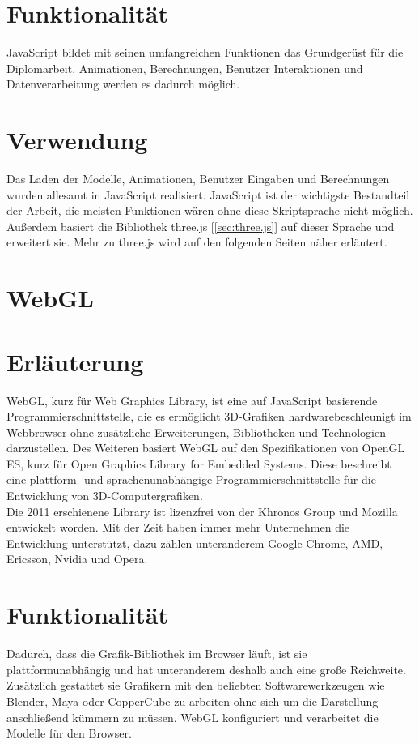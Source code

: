 \section*{Funktionalität}
JavaScript bildet mit seinen umfangreichen Funktionen das Grundgerüst für die Diplomarbeit. Animationen, Berechnungen, Benutzer Interaktionen und Datenverarbeitung werden es dadurch möglich.


\section*{Verwendung}
Das Laden der Modelle, Animationen, Benutzer Eingaben und Berechnungen wurden allesamt in JavaScript realisiert. JavaScript ist der wichtigste Bestandteil der Arbeit, die meisten Funktionen wären ohne diese Skriptsprache nicht möglich.  Außerdem basiert die Bibliothek three.js [\ref{sec:three.js}] auf dieser Sprache und erweitert sie. Mehr zu three.js wird auf den folgenden Seiten näher erläutert.

\newpage
\clearpage


\section{WebGL}\label{sec:WebGL}
\cite{khronos_webgl}\cite{mdn_webgl}
\section*{Erläuterung}
WebGL, kurz für Web Graphics Library, ist eine auf JavaScript basierende Programmierschnittstelle, die es ermöglicht 3D-Grafiken hardwarebeschleunigt im Webbrowser ohne zusätzliche Erweiterungen, Bibliotheken und Technologien darzustellen. Des Weiteren basiert WebGL auf den Spezifikationen von OpenGL ES, kurz für Open Graphics Library for Embedded Systems. Diese beschreibt eine plattform- und sprachenunabhängige Programmierschnittstelle für die Entwicklung von 3D-Computergrafiken. 
\\
Die 2011 erschienene Library ist lizenzfrei von der Khronos Group und Mozilla entwickelt worden. Mit der Zeit haben immer mehr Unternehmen die Entwicklung unterstützt, dazu zählen unteranderem Google Chrome, AMD, Ericsson, Nvidia und Opera. 


\section*{Funktionalität}
Dadurch, dass die Grafik-Bibliothek im Browser läuft, ist sie plattformunabhängig und hat unteranderem deshalb auch eine große Reichweite. \\Zusätzlich gestattet sie Grafikern mit den beliebten Softwarewerkzeugen wie Blender, Maya oder CopperCube zu arbeiten ohne sich um die Darstellung anschließend kümmern zu müssen. WebGL konfiguriert und verarbeitet die Modelle für den Browser.

